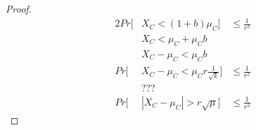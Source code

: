 
\begin{proof}

    \begin{alignat*}{2}
        Pr[&X_C < (1+b)\mu_C]& \le \frac{1}{r^2}\\ 
        &X_C < \mu_C + \mu_C b&\\
        &X_C - \mu_C < \mu_C b&\\
        Pr[&X_C - \mu_C < \mu_C r \frac{1}{\sqrt{k}}]& \le \frac{1}{r^2}\\ 
        &???&\\
        Pr[&|X_C - \mu_C| > r \sqrt{\mu}] &\le \frac{1}{r^2}
    \end{alignat*}

\end{proof}

